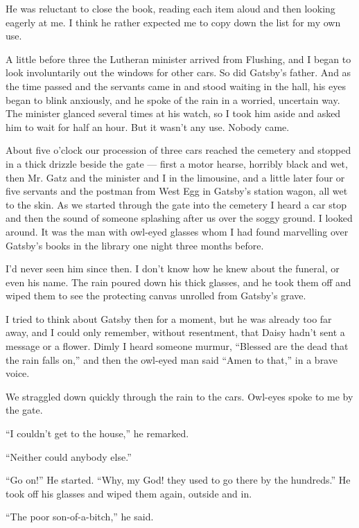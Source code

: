 \documentclass{znotebook}
\begin{document}
He was reluctant to close the book, reading each item aloud and then looking eagerly at me. I think he rather expected me to copy down the list for my own use.

A little before three the Lutheran minister arrived from Flushing, and I began to look involuntarily out the windows for other cars. So did Gatsby's father. And as the time passed and the servants came in and stood waiting in the hall, his eyes began to blink anxiously, and he spoke of the rain in a worried, uncertain way. The minister glanced several times at his watch, so I took him aside and asked him to wait for half an hour. But it wasn't any use. Nobody came.

About five o'clock our procession of three cars reached the cemetery and stopped in a thick drizzle beside the gate ---{} first a motor hearse, horribly black and wet, then Mr. Gatz and the minister and I in the limousine, and a little later four or five servants and the postman from West Egg in Gatsby's station wagon, all wet to the skin. As we started through the gate into the cemetery I heard a car stop and then the sound of someone splashing after us over the soggy ground. I looked around. It was the man with owl-eyed glasses whom I had found marvelling over Gatsby's books in the library one night three months before.

I'd never seen him since then. I don't know how he knew about the funeral, or even his name. The rain poured down his thick glasses, and he took them off and wiped them to see the protecting canvas unrolled from Gatsby's grave.

I tried to think about Gatsby then for a moment, but he was already too far away, and I could only remember, without resentment, that Daisy hadn't sent a message or a flower. Dimly I heard someone murmur, ``Blessed are the dead that the rain falls on,'' and then the owl-eyed man said ``Amen to that,'' in a brave voice.

We straggled down quickly through the rain to the cars. Owl-eyes spoke to me by the gate.

``I couldn't get to the house,'' he remarked.

``Neither could anybody else.''

``Go on!'' He started. ``Why, my God! they used to go there by the hundreds.'' He took off his glasses and wiped them again, outside and in.

``The poor son-of-a-bitch,'' he said.
\end{document}

